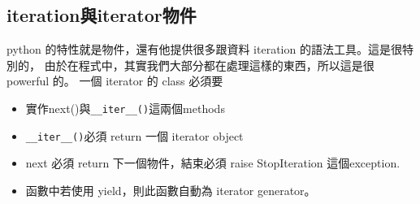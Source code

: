   \subsection{iteration與iterator物件}
  python 的特性就是物件，還有他提供很多跟資料 iteration 的語法工具。這是很特別的，
  由於在程式中，其實我們大部分都在處理這樣的東西，所以這是很 powerful 的。
  一個 iterator 的 class 必須要
  \begin{itemize}
    \item 實作next()與\verb=__iter__()=這兩個methods
    \item \verb=__iter__()=必須 return 一個 iterator object
    \item next 必須 return 下一個物件，結束必須 raise StopIteration 這個exception.
    \item 函數中若使用 yield，則此函數自動為 iterator generator。
  \end{itemize}

